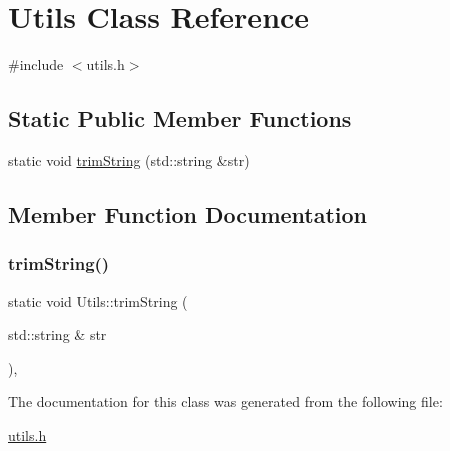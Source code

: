 \hypertarget{class_utils}{}\section{Utils Class Reference}
\label{class_utils}


{\ttfamily \#include $<$utils.\+h$>$}

\subsection*{Static Public Member Functions}
\begin{DoxyCompactItemize}
\item 
static void \mbox{\hyperlink{class_utils_a9f732077709692ecef96f169f79e7c15}{trim\+String}} (std\+::string \&str)
\end{DoxyCompactItemize}


\subsection{Member Function Documentation}
\mbox{\label{class_utils_a9f732077709692ecef96f169f79e7c15}} 
\subsubsection{\texorpdfstring{trimString()}{trimString()}}
{\footnotesize\ttfamily static void Utils\+::trim\+String (\begin{DoxyParamCaption}\item[{std\+::string \&}]{str }\end{DoxyParamCaption})\hspace{0.3cm}{\ttfamily [inline]}, {\ttfamily [static]}}



The documentation for this class was generated from the following file\+:\begin{DoxyCompactItemize}
\item 
\mbox{\hyperlink{utils_8h}{utils.\+h}}\end{DoxyCompactItemize}

